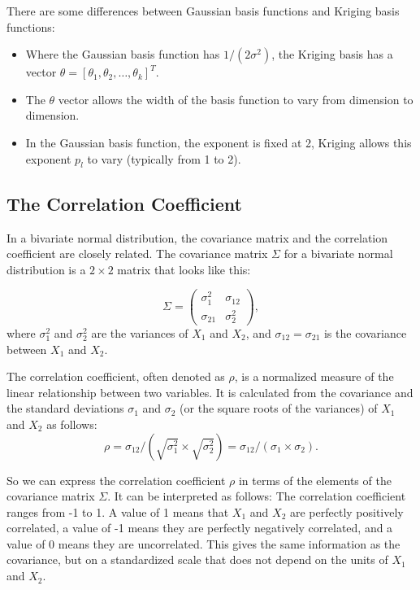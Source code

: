\documentclass[
  letterpaper,
  DIV=11,
  numbers=noendperiod]{scrreprt}
\providecommand{\tightlist}{%
  \setlength{\itemsep}{0pt}\setlength{\parskip}{0pt}}\usepackage{longtable,booktabs,array}
\begin{document}
There are some differences between Gaussian basis functions and Kriging
basis functions:

\begin{itemize}
\tightlist
\item
  Where the Gaussian basis function has \(1/(2\sigma^2)\), the Kriging
  basis has a vector
  \(\theta = [\theta_1, \theta_2, \ldots, \theta_k]^T\).
\item
  The \(\theta\) vector allows the width of the basis function to vary
  from dimension to dimension.
\item
  In the Gaussian basis function, the exponent is fixed at 2, Kriging
  allows this exponent \(p_l\) to vary (typically from 1 to 2).
\end{itemize}

\hypertarget{the-correlation-coefficient}{%
\subsection{The Correlation
Coefficient}\label{the-correlation-coefficient}}

In a bivariate normal distribution, the covariance matrix and the
correlation coefficient are closely related. The covariance matrix
\(\Sigma\) for a bivariate normal distribution is a \(2\times 2\) matrix
that looks like this:

\[
\Sigma =
\begin{pmatrix}
\sigma_1^2 & \sigma_{12}\\
\sigma_{21} & \sigma_2^2
\end{pmatrix},
\] where \(\sigma_1^2\) and \(\sigma_2^2\) are the variances of \(X_1\)
and \(X_2\), and \(\sigma_{12} = \sigma_{21}\) is the covariance between
\(X_1\) and \(X_2\).

The correlation coefficient, often denoted as \(\rho\), is a normalized
measure of the linear relationship between two variables. It is
calculated from the covariance and the standard deviations \(\sigma_1\)
and \(\sigma_2\) (or the square roots of the variances) of \(X_1\) and
\(X_2\) as follows: \[
\rho = \sigma_{12} / (\sqrt{\sigma_1^2} \times \sqrt{\sigma_2^2}) = \sigma_{12} / (\sigma_1 \times \sigma_2).
\]

So we can express the correlation coefficient \(\rho\) in terms of the
elements of the covariance matrix \(\Sigma\). It can be interpreted as
follows: The correlation coefficient ranges from -1 to 1. A value of 1
means that \(X_1\) and \(X_2\) are perfectly positively correlated, a
value of -1 means they are perfectly negatively correlated, and a value
of 0 means they are uncorrelated. This gives the same information as the
covariance, but on a standardized scale that does not depend on the
units of \(X_1\) and \(X_2\).
\end{document}
